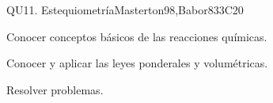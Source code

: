 \begin{syllabus}
\begin{unit}{QU11. Estequiometría}{}{Masterton98,Babor83}{3}{C20}
   \begin{learningoutcomes}
      \item Conocer conceptos básicos de las reacciones químicas.
      \item Conocer y aplicar las leyes ponderales y volumétricas.
      \item Resolver problemas.
   \end{learningoutcomes}
\end{unit}



\begin{coursebibliography}
\end{coursebibliography}

\end{syllabus}
